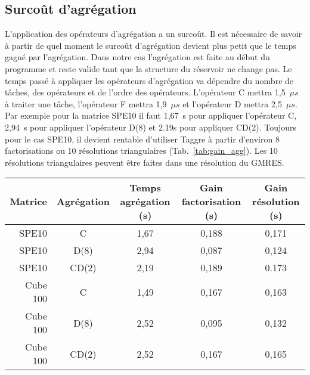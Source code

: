 \subsection{Surcoût d'agrégation}
L'application des opérateurs d'agrégation a un surcoût.
%
Il est nécessaire de savoir à partir de quel moment le surcoût d'agrégation devient plus petit que le temps gagné par l'agrégation.
%
Dans notre cas l'agrégation est faite au début du programme et reste valide tant que la structure du réservoir ne change pas.
%
Le temps passé à appliquer les opérateurs d'agrégation va dépendre du nombre de tâches, des opérateurs et de l'ordre des opérateurs.
%
L'opérateur C mettra 1,5~$\mu{s}$ à traiter une tâche, l'opérateur F mettra 1,9~$\mu{s}$ et l'opérateur D mettra 2,5~$\mu{s}$.
%
Par exemple pour la matrice SPE10 il faut 1,67~s pour appliquer l'opérateur C, 2,94~s pour appliquer l'opérateur D(8) et 2.19s pour appliquer CD(2).
%
Toujours pour le cas SPE10, il devient rentable d'utiliser Taggre à partir d'environ 8 factorisations ou 10 résolutions triangulaires (Tab.~\ref{tab:gain_agg}).
%
Les 10 résolutions triangulaires peuvent être faites dans une résolution du GMRES.



\begin{center}
  \begin{tabular}{ | r | c || c | c | c | }
    \hline
    Matrice & Agrégation & Temps agrégation (s) & Gain factorisation (s) & Gain résolution (s)\\
    \hline
    \hline
    SPE10   &      C     & 1,67          & 0,188          & 0,171 \\
    \hline
    SPE10   &    D(8)    & 2,94          & 0,087          & 0,124 \\
    \hline
    SPE10   &    CD(2)   & 2,19          & 0,189          & 0.173 \\
    \hline
    \hline
    Cube 100&      C     & 1,49          & 0,167          & 0,163 \\
    \hline
    Cube 100&    D(8)    & 2,52          & 0,095          & 0,132 \\
    \hline
    Cube 100&    CD(2)   & 2,52          & 0,167          & 0,165 \\
    \hline
  \end{tabular}
  \label{tab:gain_agg}
\end{center}
